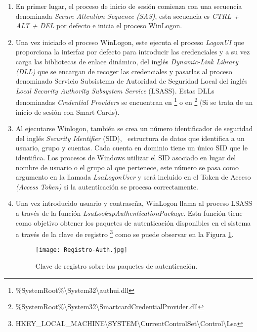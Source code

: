 \begin{enumerate}
\item En primer lugar, el proceso de inicio de sesión comienza con una secuencia denominada {\it Secure Attention Sequence (SAS)}, esta secuencia es {\it CTRL + ALT + DEL} por defecto e inicia el proceso WinLogon.

\item Una vez iniciado el proceso WinLogon, este ejecuta el proceso {\it LogonUI} que proporciona la interfaz por defecto para introducir las credenciales y a su vez carga las bibliotecas de enlace dinámico, del inglés {\it Dynamic-Link Library (DLL)} que se encargan de recoger las credenciales y pasarlas al proceso denominado Servicio Subsistema de Autoridad de Seguridad Local del inglés {\it Local Security Authority Subsystem Service} (LSASS). Estas DLLs denominadas {\it Credential Providers} se encuentran en \footnote{\%SystemRoot\%\textbackslash{}System32\textbackslash{}authui.dll} o en \footnote{\%SystemRoot\%\textbackslash{}System32\textbackslash{}SmartcardCredentialProvider.dll} (Si se trata de un inicio de sesión con Smart Cards).

\item Al ejecutarse Winlogon, también se crea un número identificador de seguridad del inglés {\it Security Identifier} (SID),~\cite{Capitulo2:SID} estructura de datos que identifica a un usuario, grupo y cuentas. Cada cuenta en dominio tiene un único SID que le identifica. Los procesos de Windows utilizar el SID asociado en lugar del nombre de usuario o el grupo al que pertenece, este número se pasa como argumento en la llamada {\it LsaLogonUser} y será incluido en el Token de Acceso {\it (Access Token)} si la autenticación se procesa correctamente. 

\item Una vez introducido usuario y contraseña, WinLogon llama al proceso LSASS a través de la función {\it LsaLookupAuthenticationPackage}. Esta función tiene como objetivo obtener los paquetes de autenticación disponibles en el sistema a través de la clave de registro \footnote{HKEY\_LOCAL\_MACHINE\textbackslash{}SYSTEM\textbackslash{}CurrentControlSet\textbackslash{}Control\textbackslash{}Lsa} como se puede observar en la Figura \ref{Registro-Auth}.

\begin{figure}[t!] %
\begin{center}
\texttt{[image: Registro-Auth.jpg]}
\end{center}
\caption{Clave de registro sobre los paquetes de autenticación.}
\label{Registro-Auth}
\end{figure}


\end{enumerate}

